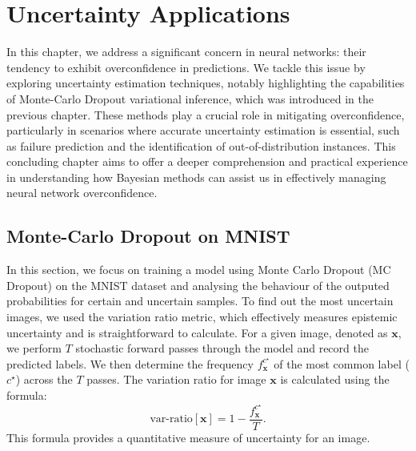 \graphicspath{{figs/3c}}

\chapter{Uncertainty Applications}
In this chapter, we address a significant concern in neural networks: their tendency to exhibit overconfidence in predictions. We tackle this issue by exploring uncertainty estimation techniques, notably highlighting the capabilities of Monte-Carlo Dropout variational inference, which was introduced in the previous chapter. These methods play a crucial role in mitigating overconfidence, particularly in scenarios where accurate uncertainty estimation is essential, such as failure prediction and the identification of out-of-distribution instances. This concluding chapter aims to offer a deeper comprehension and practical experience in understanding how Bayesian methods can assist us in effectively managing neural network overconfidence.

\section{Monte-Carlo Dropout on MNIST}
In this section, we focus on training a model using Monte Carlo Dropout (MC Dropout) on the MNIST dataset and analysing the behaviour of the outputed probabilities for certain and uncertain samples. To find out the most uncertain images, we used the variation ratio metric, which effectively measures epistemic uncertainty and is straightforward to calculate. For a given image, denoted as $ \mathbf{x} $, we perform $ T $ stochastic forward passes through the model and record the predicted labels. We then determine the frequency $ f^{c^\star }_\mathbf{x} $ of the most common label ($ c^\star $) across the $ T $ passes. The variation ratio for image $ \mathbf{x} $ is calculated using the formula:
\[
    \text{var-ratio}[\mathbf{x}] = 1 - \frac{f^{c^\star }_\mathbf{x}}{T}
.\]
This formula provides a quantitative measure of uncertainty for an image.


